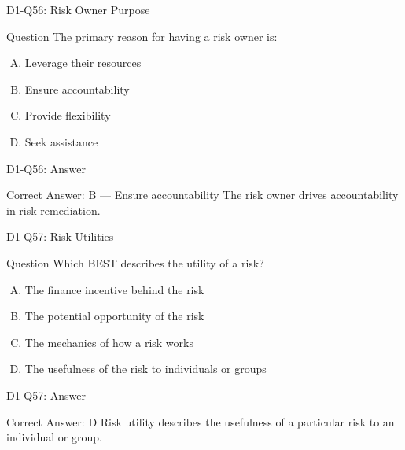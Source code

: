 \documentclass{beamer}
\begin{document}
	\begin{frame}{D1-Q56: Risk Owner Purpose}
		\begin{block}{Question}
			The primary reason for having a risk owner is:
		\end{block}
		\begin{enumerate}[(A)]
			\item Leverage their resources
			\item Ensure accountability
			\item Provide flexibility
			\item Seek assistance
		\end{enumerate}
	\end{frame}
	\begin{frame}{D1-Q56: Answer}
		\begin{block}{Correct Answer: B --- Ensure accountability}
			The risk owner drives accountability in risk remediation.
		\end{block}
	\end{frame}
	
	\begin{frame}{D1-Q57: Risk Utilities}
		\begin{block}{Question}
			Which BEST describes the utility of a risk?
		\end{block}
		\begin{enumerate}[(A)]
			\item The finance incentive behind the risk
			\item The potential opportunity of the risk
			\item The mechanics of how a risk works
			\item The usefulness of the risk to individuals or groups
		\end{enumerate}
	\end{frame}
	\begin{frame}{D1-Q57: Answer}
		\begin{block}{Correct Answer: D}
			Risk utility describes the usefulness of a particular risk to an individual or group.
		\end{block}
	\end{frame}
	
\end{document}
